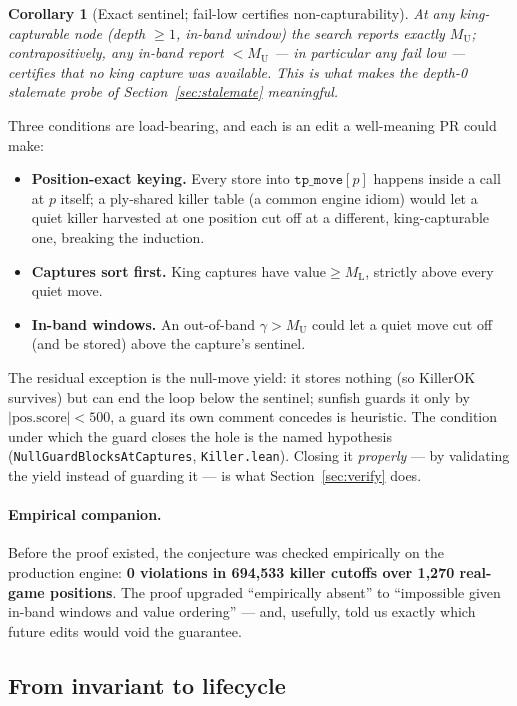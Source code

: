 \documentclass[11pt]{article}
\newcommand{\MU}{M_{\mathrm{U}}}    %
\newcommand{\ML}{M_{\mathrm{L}}}    %
\newcommand{\leanref}[2]{(\texttt{#1}, \texttt{#2})}%
\theoremstyle{plain}
\newtheorem{corollary}[theorem]{Corollary}
\theoremstyle{definition}
\theoremstyle{remark}
\begin{document}
\begin{corollary}[Exact sentinel; fail-low certifies non-capturability]
At any king-capturable node (depth $\ge 1$, in-band window) the search
reports exactly $\MU$; contrapositively, any in-band report
${} < \MU$ --- in particular any fail low --- certifies that no king
capture was available.  This is what makes the depth-0 stalemate probe
of Section~\ref{sec:stalemate} meaningful.
\end{corollary}

Three conditions are load-bearing, and each is an edit a well-meaning PR
could make:
\begin{itemize}
  \item \textbf{Position-exact keying.}  Every store into
    $\texttt{tp\_move}[p]$ happens inside a call at $p$ itself; a
    ply-shared killer table (a common engine idiom) would let a quiet
    killer harvested at one position cut off at a different,
    king-capturable one, breaking the induction.
  \item \textbf{Captures sort first.}  King captures have
    $\mathrm{value} \ge \ML$, strictly above every quiet move.
  \item \textbf{In-band windows.}  An out-of-band $\gamma > \MU$ could
    let a quiet move cut off (and be stored) above the capture's
    sentinel.
\end{itemize}

The residual exception is the null-move yield: it stores nothing (so
$\mathrm{KillerOK}$ survives) but can end the loop below the sentinel;
sunfish guards it only by $|\mathrm{pos.score}| < 500$, a guard its own
comment concedes is heuristic.  The condition under which the guard
closes the hole is the named hypothesis
\leanref{NullGuardBlocksAtCaptures}{Killer.lean}.  Closing it
\emph{properly} --- by validating the yield instead of guarding it ---
is what Section~\ref{sec:verify} does.

\paragraph{Empirical companion.}  Before the proof existed, the
conjecture was checked empirically on the production engine:
\textbf{0 violations in 694{,}533 killer cutoffs over 1{,}270 real-game
positions}.  The proof upgraded ``empirically absent'' to ``impossible
given in-band windows and value ordering'' --- and, usefully, told us
exactly which future edits would void the guarantee.

\subsection{From invariant to lifecycle}
\label{sec:killerlife}
\end{document}
